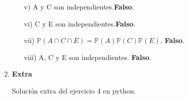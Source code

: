 \documentclass[11pt,letterpaper]{article}
\newcommand{\mP}{\mathbb{P}}
\begin{document}
\begin{enumerate}
\begin{itemize}
\item[v)] A y C son independientes.\textbf{Falso}.
\item[vi)] C y E son independientes.\textbf{Falso}.
\item[vii)] $\mP (A \cap C \cap E) = \mP (A)\mP (C)\mP (E)$. \textbf{Falso}.
\item[viii)] A, C y E son
independientes. \textbf{Falso}.
\end{itemize}

\item \textbf{Extra} 

Solución extra del ejercicio 4 en python. 




\end{enumerate}
\end{document}
